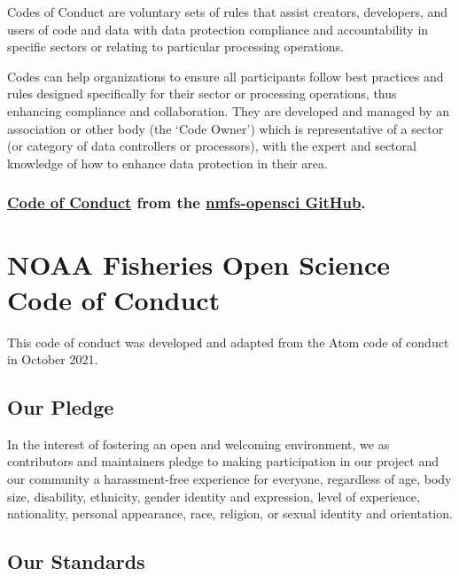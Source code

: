 \documentclass[
  letterpaper,
  oneside,
  open=any]{scrbook}
\begin{document}
Codes of Conduct are voluntary sets of rules that assist creators,
developers, and users of code and data with data protection compliance
and accountability in specific sectors or relating to particular
processing operations.

Codes can help organizations to ensure all participants follow best
practices and rules designed specifically for their sector or processing
operations, thus enhancing compliance and collaboration. They are
developed and managed by an association or other body (the `Code Owner')
which is representative of a sector (or category of data controllers or
processors), with the expert and sectoral knowledge of how to enhance
data protection in their area.

\hypertarget{code-of-conduct-from-the-nmfs-opensci-github.}{%
\subsection{\texorpdfstring{\href{https://github.com/nmfs-opensci/.github/blob/main/CODE_OF_CONDUCT.md}{Code
of Conduct} from the \href{https://nmfs-opensci.github.io/}{nmfs-opensci
GitHub}.}{Code of Conduct from the nmfs-opensci GitHub.}}\label{code-of-conduct-from-the-nmfs-opensci-github.}}

\hypertarget{noaa-fisheries-open-science-code-of-conduct}{%
\chapter{NOAA Fisheries Open Science Code of
Conduct}\label{noaa-fisheries-open-science-code-of-conduct}}

This code of conduct was developed and adapted from the Atom code of
conduct in October 2021.

\hypertarget{our-pledge}{%
\section{Our Pledge}\label{our-pledge}}

In the interest of fostering an open and welcoming environment, we as
contributors and maintainers pledge to making participation in our
project and our community a harassment-free experience for everyone,
regardless of age, body size, disability, ethnicity, gender identity and
expression, level of experience, nationality, personal appearance, race,
religion, or sexual identity and orientation.

\hypertarget{our-standards}{%
\section{Our Standards}\label{our-standards}}
\end{document}
